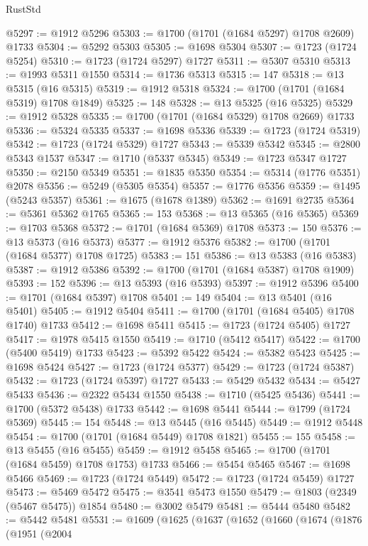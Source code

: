 \begin{lexlean}{RustStd}
\begin{coremodule}
@5297 := @1912 @5296
@5303 := @1700 (@1701 (@1684 @5297) @1708 @2609) @1733
@5304 := @5292 @5303
@5305 := @1698 @5304
@5307 := @1723 (@1724 @5254)
@5310 := @1723 (@1724 @5297) @1727
@5311 := @5307 @5310
@5313 := @1993 @5311 @1550
@5314 := @1736 @5313
@5315 := 147
@5318 := @13 @5315 (@16 @5315)
@5319 := @1912 @5318
@5324 := @1700 (@1701 (@1684 @5319) @1708 @1849)
@5325 := 148
@5328 := @13 @5325 (@16 @5325)
@5329 := @1912 @5328
@5335 := @1700 (@1701 (@1684 @5329) @1708 @2669) @1733
@5336 := @5324 @5335
@5337 := @1698 @5336
@5339 := @1723 (@1724 @5319)
@5342 := @1723 (@1724 @5329) @1727
@5343 := @5339 @5342
@5345 := @2800 @5343 @1537
@5347 := @1710 (@5337 @5345)
@5349 := @1723 @5347 @1727
@5350 := @2150 @5349
@5351 := @1835 @5350
@5354 := @5314 (@1776 @5351) @2078
@5356 := @5249 (@5305 @5354)
@5357 := @1776 @5356
@5359 := @1495 (@5243 @5357)
@5361 := @1675 (@1678 @1389)
@5362 := @1691 @2735
@5364 := @5361 @5362 @1765
@5365 := 153
@5368 := @13 @5365 (@16 @5365)
@5369 := @1703 @5368
@5372 := @1701 (@1684 @5369) @1708
@5373 := 150
@5376 := @13 @5373 (@16 @5373)
@5377 := @1912 @5376
@5382 := @1700 (@1701 (@1684 @5377) @1708 @1725)
@5383 := 151
@5386 := @13 @5383 (@16 @5383)
@5387 := @1912 @5386
@5392 := @1700 (@1701 (@1684 @5387) @1708 @1909)
@5393 := 152
@5396 := @13 @5393 (@16 @5393)
@5397 := @1912 @5396
@5400 := @1701 (@1684 @5397) @1708
@5401 := 149
@5404 := @13 @5401 (@16 @5401)
@5405 := @1912 @5404
@5411 := @1700 (@1701 (@1684 @5405) @1708 @1740) @1733
@5412 := @1698 @5411
@5415 := @1723 (@1724 @5405) @1727
@5417 := @1978 @5415 @1550
@5419 := @1710 (@5412 @5417)
@5422 := @1700 (@5400 @5419) @1733
@5423 := @5392 @5422
@5424 := @5382 @5423
@5425 := @1698 @5424
@5427 := @1723 (@1724 @5377)
@5429 := @1723 (@1724 @5387)
@5432 := @1723 (@1724 @5397) @1727
@5433 := @5429 @5432
@5434 := @5427 @5433
@5436 := @2322 @5434 @1550
@5438 := @1710 (@5425 @5436)
@5441 := @1700 (@5372 @5438) @1733
@5442 := @1698 @5441
@5444 := @1799 (@1724 @5369)
@5445 := 154
@5448 := @13 @5445 (@16 @5445)
@5449 := @1912 @5448
@5454 := @1700 (@1701 (@1684 @5449) @1708 @1821)
@5455 := 155
@5458 := @13 @5455 (@16 @5455)
@5459 := @1912 @5458
@5465 := @1700 (@1701 (@1684 @5459) @1708 @1753) @1733
@5466 := @5454 @5465
@5467 := @1698 @5466
@5469 := @1723 (@1724 @5449)
@5472 := @1723 (@1724 @5459) @1727
@5473 := @5469 @5472
@5475 := @3541 @5473 @1550
@5479 := @1803 (@2349 (@5467 @5475)) @1854
@5480 := @3002 @5479
@5481 := @5444 @5480
@5482 := @5442 @5481
@5531 := @1609
    (@1625
      (@1637
        (@1652
          (@1660
            (@1674
              (@1876
                (@1951
                  (@2004

\end{coremodule}
\end{lexlean}
